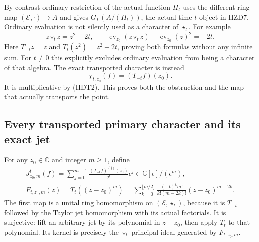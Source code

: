 By contrast ordinary restriction of the actual function $H_t$
uses the different ring map $(\mathcal E,\cdot)\to A$ and gives
$G_L(A/(H_t))$, the actual time-$t$ object in HZD7. Ordinary
evaluation is not silently used as a character of $\star_t$.
For example
\begin{equation}\tag{HDT7}
 z\star_t z=z^2-2t,\qquad
 \operatorname{ev}_{z_0}(z\star_t z)
  -\operatorname{ev}_{z_0}(z)^2=-2t.
\end{equation}
Here $T_{-t}z=z$ and $T_t(z^2)=z^2-2t$, proving both formulas
without any infinite sum. For $t\ne0$ this explicitly excludes
ordinary evaluation from being a character of that algebra.
The exact transported character is instead
\[
 \chi_{t,z_0}(f)=(T_{-t}f)(z_0).
\]
It is multiplicative by (HDT2). This proves both the obstruction
and the map that actually transports the point.

\subsection{Every transported primary character and its exact jet}

For any $z_0\in\mathbb C$ and integer $m\ge1$, define
\begin{equation}\tag{HDT8}
\begin{gathered}
 J^t_{z_0,m}(f)=
   \sum_{j=0}^{m-1}\frac{(T_{-t}f)^{(j)}(z_0)}{j!}\epsilon^j
       \in\mathbb C[\epsilon]/(\epsilon^m),\\
 F_{t,z_0,m}(z)=T_t((z-z_0)^m)
   =\sum_{k=0}^{\lfloor m/2\rfloor}
       \frac{(-t)^k m!}{k!(m-2k)!}(z-z_0)^{m-2k}.
\end{gathered}
\end{equation}
The first map is a unital ring homomorphism on
$(\mathcal E,\star_t)$, because it is $T_{-t}$ followed by the
Taylor jet homomorphism with its actual factorials. It is
surjective: lift an arbitrary jet by its polynomial in $z-z_0$,
then apply $T_t$ to that polynomial. Its kernel is precisely
the $\star_t$ principal ideal generated by $F_{t,z_0,m}$.

